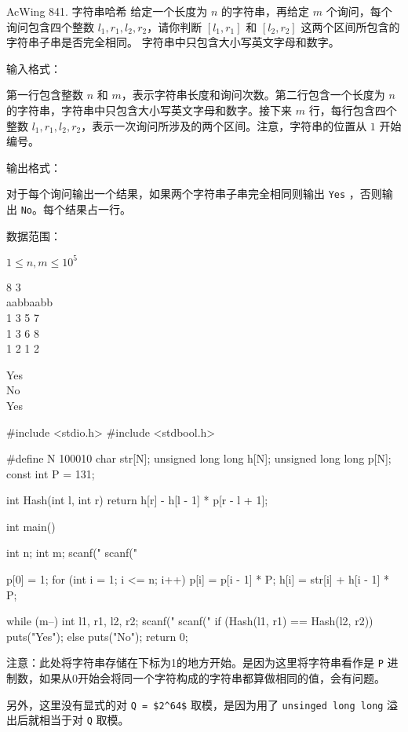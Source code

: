 \begin{titledbox}{AcWing 841. 字符串哈希}
给定一个长度为 $n$ 的字符串，再给定 $m$ 个询问，每个询问包含四个整数 $l_1, r_1, l_2, r_2$，请你判断 $[l_1, r_1]$ 和 $[l_2, r_2]$ 这两个区间所包含的字符串子串是否完全相同。
字符串中只包含大小写英文字母和数字。

输入格式：

第一行包含整数 $n$ 和 $m$，表示字符串长度和询问次数。第二行包含一个长度为 $n$ 的字符串，字符串中只包含大小写英文字母和数字。接下来 $m$ 行，每行包含四个整数 $l_1, r_1, l_2, r_2$，表示一次询问所涉及的两个区间。注意，字符串的位置从 $1$ 开始编号。

输出格式：

对于每个询问输出一个结果，如果两个字符串子串完全相同则输出 \lstinline{Yes} ，否则输出 \lstinline{No}。每个结果占一行。

数据范围：

$1 \le n, m \le 10^5$

\begin{inputblock}
    8 3 \\
    aabbaabb \\
    1 3 5 7 \\
    1 3 6 8 \\
    1 2 1 2
\end{inputblock}
\begin{outputblock}
    Yes \\
    No \\
    Yes
\end{outputblock}
\end{titledbox}

\begin{mycpptwocol}[字符串前缀哈希法]
#include <stdio.h>
#include <stdbool.h>

#define N 100010
char str[N];
unsigned long long h[N];
unsigned long long p[N];
const int P = 131;

int Hash(int l, int r)
{
    return h[r] - h[l - 1] * p[r - l + 1];
}

int main()
{
    int n;
    int m;
    scanf("%
    scanf("%

    p[0] = 1;
    for (int i = 1; i <= n; i++) {
        p[i] = p[i - 1] * P;
        h[i] = str[i] + h[i - 1] * P;
    }

    while (m--) {
        int l1, r1, l2, r2;
        scanf("%
        scanf("%
        if (Hash(l1, r1) == Hash(l2, r2)) {
            puts("Yes");
        } else {
            puts("No");
        }
    }
    return 0;
}
\end{mycpptwocol}

\begin{information}
    注意：此处将字符串存储在下标为1的地方开始。是因为这里将字符串看作是 \lstinline{P} 进制数，如果从0开始会将同一个字符构成的字符串都算做相同的值，会有问题。
    
    另外，这里没有显式的对 \lstinline{Q = $2^64$} 取模，是因为用了 \lstinline{unsinged long long} 溢出后就相当于对 \lstinline{Q} 取模。
\end{information}

